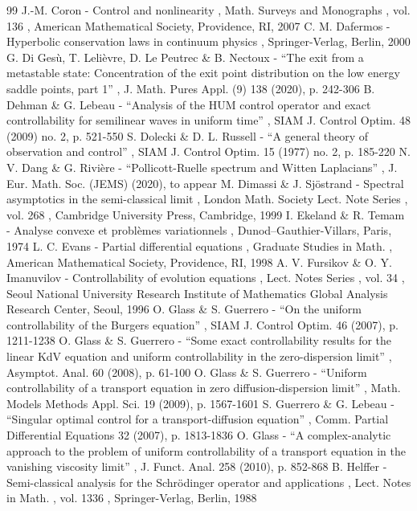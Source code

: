 \documentclass[10pt]{amsart}
\theoremstyle{definition}
\begin{document}
\begin{thebibliography}{99}
 J.-M. Coron - Control and nonlinearity , Math. Surveys and Monographs , vol. 136 , American Mathematical Society, Providence, RI, 2007
 C. M. Dafermos - Hyperbolic conservation laws in continuum physics , Springer-Verlag, Berlin, 2000
 G. Di Gesù, T. Lelièvre, D. Le Peutrec \& B. Nectoux - “The exit from a metastable state: Concentration of the exit point distribution on the low energy saddle points, part 1” , J. Math. Pures Appl. (9) 138 (2020), p. 242-306
 B. Dehman \& G. Lebeau - “Analysis of the HUM control operator and exact controllability for semilinear waves in uniform time” , SIAM J. Control Optim. 48 (2009) no. 2, p. 521-550
 S. Dolecki \& D. L. Russell - “A general theory of observation and control” , SIAM J. Control Optim. 15 (1977) no. 2, p. 185-220
 N. V. Dang \& G. Rivière - “Pollicott-Ruelle spectrum and Witten Laplacians” , J. Eur. Math. Soc. (JEMS) (2020), to appear
 M. Dimassi \& J. Sjöstrand - Spectral asymptotics in the semi-classical limit , London Math. Society Lect. Note Series , vol. 268 , Cambridge University Press, Cambridge, 1999
 I. Ekeland \& R. Temam - Analyse convexe et problèmes variationnels , Dunod–Gauthier-Villars, Paris, 1974
 L. C. Evans - Partial differential equations , Graduate Studies in Math. , American Mathematical Society, Providence, RI, 1998
 A. V. Fursikov \& O. Y. Imanuvilov - Controllability of evolution equations , Lect. Notes Series , vol. 34 , Seoul National University Research Institute of Mathematics Global Analysis Research Center, Seoul, 1996
 O. Glass \& S. Guerrero - “On the uniform controllability of the Burgers equation” , SIAM J. Control Optim. 46 (2007), p. 1211-1238
 O. Glass \& S. Guerrero - “Some exact controllability results for the linear KdV equation and uniform controllability in the zero-dispersion limit” , Asymptot. Anal. 60 (2008), p. 61-100
 O. Glass \& S. Guerrero - “Uniform controllability of a transport equation in zero diffusion-dispersion limit” , Math. Models Methods Appl. Sci. 19 (2009), p. 1567-1601
 S. Guerrero \& G. Lebeau - “Singular optimal control for a transport-diffusion equation” , Comm. Partial Differential Equations 32 (2007), p. 1813-1836
 O. Glass - “A complex-analytic approach to the problem of uniform controllability of a transport equation in the vanishing viscosity limit” , J. Funct. Anal. 258 (2010), p. 852-868
 B. Helffer - Semi-classical analysis for the Schrödinger operator and applications , Lect. Notes in Math. , vol. 1336 , Springer-Verlag, Berlin, 1988

\end{thebibliography}
\end{document}
